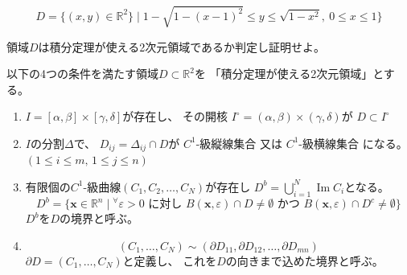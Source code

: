 \documentclass[12pt,b5paper]{ltjsarticle}
\newcommand{\Img}{\mathop{\mathrm{Im}}\nolimits}
\begin{document}
\hrulefill


\begin{equation}
 D=\{
  (x,y)\in\mathbb{R}^2\} \mid
  1-\sqrt{1-(x-1)^2} \leq y \leq \sqrt{1-x^2},
  \ 0\leq x \leq 1
  \}
\end{equation}

領域$D$は積分定理が使える2次元領域であるか判定し証明せよ。


\dotfill

以下の4つの条件を満たす領域$D\subset\mathbb{R}^2$を
「積分定理が使える2次元領域」とする。

\begin{enumerate}
 \item
      $I=[\alpha,\beta]\times[\gamma,\delta]$が存在し、
      その開核
      $I^\circ = (\alpha,\beta)\times(\gamma,\delta)$が
      $D\subset I^\circ$
 \item
      $I$の分割$\Delta$で、
      $D_{ij}=\Delta_{ij}\cap D$が
      $C^1$-級縦線集合 又は $C^1$-級横線集合 になる。
      $(1\leq i \leq m,\, 1\leq j \leq n)$
 \item
      有限個の$C^1$-級曲線$(C_1,C_2,\dots ,C_N)$が存在し
      $D^{b}=\bigcup_{i=1}^{N}\Img C_i$となる。
      \begin{equation}
       D^{b}=\{
        \bm{x}\in\mathbb{R}^n \mid
        {}^{\forall}\varepsilon >0 \text{ に対し }
        B(\bm{x},\varepsilon)\cap D \ne \emptyset
        \text{ かつ }
        B(\bm{x},\varepsilon)\cap D^{c} \ne \emptyset
        \}
      \end{equation}
      $D^{b}$を$D$の境界と呼ぶ。
 \item
      \begin{equation}
       (C_1,\dots,C_N)\sim (\partial D_{11},\partial D_{12},\dots,\partial D_{mn})
      \end{equation}
      $\partial D = (C_1,\dots,C_N)$と定義し、
      これを$D$の向きまで込めた境界と呼ぶ。
\end{enumerate}

\dotfill
\end{document}
